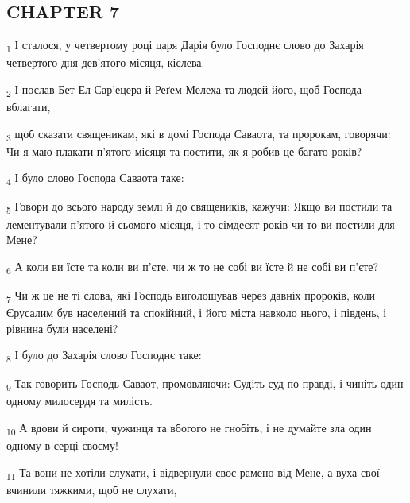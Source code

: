\subsection{CHAPTER 7}
\begin{tcolorbox}
\textsubscript{1} І сталося, у четвертому році царя Дарія було Господнє слово до Захарія четвертого дня дев'ятого місяця, кіслева.
\end{tcolorbox}
\begin{tcolorbox}
\textsubscript{2} І послав Бет-Ел Сар'ецера й Реґем-Мелеха та людей його, щоб Господа вблагати,
\end{tcolorbox}
\begin{tcolorbox}
\textsubscript{3} щоб сказати священикам, які в домі Господа Саваота, та пророкам, говорячи: Чи я маю плакати п'ятого місяця та постити, як я робив це багато років?
\end{tcolorbox}
\begin{tcolorbox}
\textsubscript{4} І було слово Господа Саваота таке:
\end{tcolorbox}
\begin{tcolorbox}
\textsubscript{5} Говори до всього народу землі й до священиків, кажучи: Якщо ви постили та лементували п'ятого й сьомого місяця, і то сімдесят років чи то ви постили для Мене?
\end{tcolorbox}
\begin{tcolorbox}
\textsubscript{6} А коли ви їсте та коли ви п'єте, чи ж то не собі ви їсте й не собі ви п'єте?
\end{tcolorbox}
\begin{tcolorbox}
\textsubscript{7} Чи ж це не ті слова, які Господь виголошував через давніх пророків, коли Єрусалим був населений та спокійний, і його міста навколо нього, і південь, і рівнина були населені?
\end{tcolorbox}
\begin{tcolorbox}
\textsubscript{8} І було до Захарія слово Господнє таке:
\end{tcolorbox}
\begin{tcolorbox}
\textsubscript{9} Так говорить Господь Саваот, промовляючи: Судіть суд по правді, і чиніть один одному милосердя та милість.
\end{tcolorbox}
\begin{tcolorbox}
\textsubscript{10} А вдови й сироти, чужинця та вбогого не гнобіть, і не думайте зла один одному в серці своєму!
\end{tcolorbox}
\begin{tcolorbox}
\textsubscript{11} Та вони не хотіли слухати, і відвернули своє рамено від Мене, а вуха свої вчинили тяжкими, щоб не слухати,
\end{tcolorbox}

